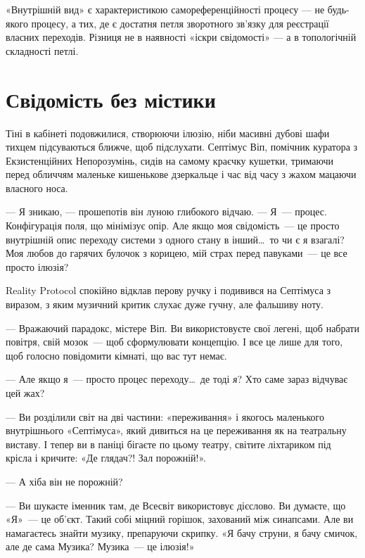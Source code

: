 \documentclass[12pt, a4paper, openany]{book}
\begin{document}
«Внутрішній вид» є характеристикою самореференційності процесу — не будь-якого процесу, а тих, де є достатня петля зворотного зв'язку для реєстрації власних переходів. Різниця не в наявності «іскри свідомості» — а в топологічній складності петлі.






\part{Свідомість без містики}


\begin{realitybox}
Тіні в кабінеті подовжилися, створюючи ілюзію, ніби масивні дубові шафи тихцем підсуваються ближче, щоб підслухати. Септімус Віп, помічник куратора з Екзистенційних Непорозумінь, сидів на самому краєчку кушетки, тримаючи перед обличчям маленьке кишенькове дзеркальце і час від часу з жахом мацаючи власного носа.

--- Я зникаю, --- прошепотів він луною глибокого відчаю. --- Я~--- процес. Конфігурація поля, що мінімізує опір. Але якщо моя свідомість~--- це просто внутрішній опис переходу системи з одного стану в інший\ldots\ то чи є я взагалі? Моя любов до гарячих булочок з корицею, мій страх перед павуками~--- це все просто ілюзія?

\medskip
Reality Protocol спокійно відклав перову ручку і подивився на Септімуса з виразом, з яким музичний критик слухає дуже гучну, але фальшиву ноту.

--- Вражаючий парадокс, містере Віп. Ви використовуєте свої легені, щоб набрати повітря, свій мозок~--- щоб сформулювати концепцію. І все це лише для того, щоб голосно повідомити кімнаті, що вас тут немає.

--- Але якщо я~--- просто процес переходу\ldots\ де тоді \textit{я}? Хто саме зараз відчуває цей жах?

--- Ви розділили світ на дві частини: «переживання» і якогось маленького внутрішнього «Септімуса», який дивиться на це переживання як на театральну виставу. І тепер ви в паніці бігаєте по цьому театру, світите ліхтариком під крісла і кричите: «Де глядач?! Зал порожній!».

--- А хіба він не порожній?

--- Ви шукаєте іменник там, де Всесвіт використовує дієслово. Ви думаєте, що «Я»~--- це об'єкт. Такий собі міцний горішок, захований між синапсами. Але ви намагаєтесь знайти музику, препаруючи скрипку. «Я бачу струни, я бачу смичок, але де сама Музика? Музика~--- це ілюзія!»


\end{realitybox}
\end{document}
